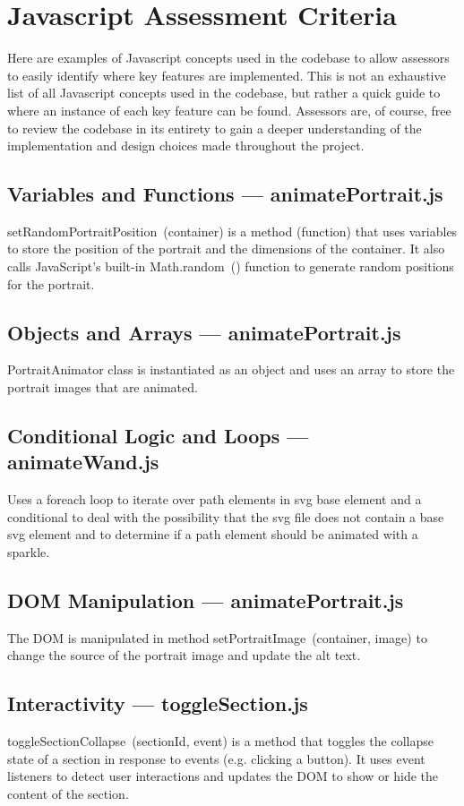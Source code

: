 \section{Javascript Assessment Criteria}\label{appendix:js}

Here are examples of Javascript concepts used in the codebase to allow assessors to easily identify where key features are implemented. This is not an exhaustive list of all Javascript concepts used in the codebase, but rather a quick guide to where an instance of each key feature can be found. Assessors are, of course, free to review the codebase in its entirety to gain a deeper understanding of the implementation and design choices made throughout the project.

\subsection*{Variables and Functions --- animatePortrait.js}
setRandomPortraitPosition~(container) is a method (function) that uses variables to store the position of the portrait and the dimensions of the container. It also calls JavaScript's built-in Math.random~() function to generate random positions for the portrait.

\subsection*{Objects and Arrays --- animatePortrait.js}
PortraitAnimator class is instantiated as an object and uses an array to store the portrait images that are animated.

\subsection*{Conditional Logic and Loops --- animateWand.js}
Uses a foreach loop to iterate over path elements in svg base element and a conditional to deal with the possibility that the svg file does not contain a base svg element and to determine if a path element should be animated with a sparkle.

\subsection*{DOM Manipulation --- animatePortrait.js}
The DOM is manipulated in method setPortraitImage~(container, image) to change the source of the portrait image and update the alt text.

\subsection*{Interactivity --- toggleSection.js}
toggleSectionCollapse~(sectionId, event) is a method that toggles the collapse state of a section in response to events (e.g. clicking a button). It uses event listeners to detect user interactions and updates the DOM to show or hide the content of the section.

